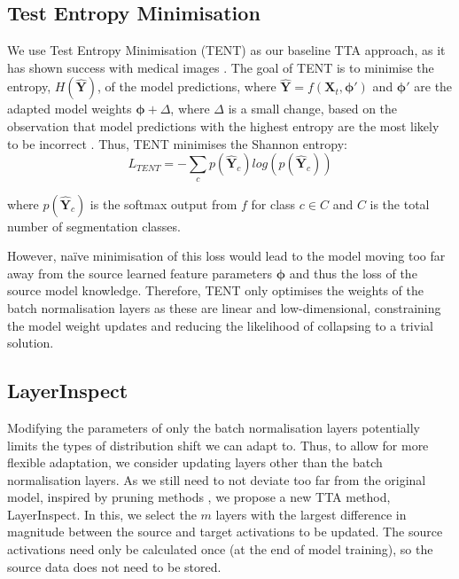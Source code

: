 \documentclass[conference]{IEEEtran}
\begin{document}
\subsection{Test Entropy Minimisation}
We use Test Entropy Minimisation (TENT) \cite{Wang2021} as our baseline TTA approach, as it has shown success with medical images \cite{valanarasu2024fly}. The goal of TENT is to minimise the entropy, $H(\bm{\hat{Y}})$, of the model predictions, where $\bm{\hat{Y}} = f(\bm{X}_t, \bm{\phi}')$ and ${\bm{\phi}'}$ are the adapted model weights ${\bm{\phi}} + \Delta$, where $\Delta$ is a small change, based on the observation that model predictions with the highest entropy are the most likely to be incorrect \cite{Wang2021}. Thus, TENT minimises the Shannon entropy:
\begin{equation}
    L_{TENT} = - \sum_c p(\bm{\hat{Y}}_c)log(p(\bm{\hat{Y}}_c))
\end{equation}
\vspace*{-1pt}

\noindent where $p(\bm{\hat{Y}}_c)$ is the softmax output from $f$ for class $c \in C$ and $C$ is the total number of segmentation classes.

However, na\"ive minimisation of this loss would lead to the model moving too far away from the source learned feature parameters $\bm{\phi}$ and thus the loss of the source model knowledge. Therefore, TENT only optimises the weights of the batch normalisation layers as these are linear and low-dimensional, constraining the model weight updates and reducing the likelihood of collapsing to a trivial solution. 

\subsection{LayerInspect}
Modifying the parameters of only the batch normalisation layers potentially limits the types of distribution shift we can adapt to. Thus, to allow for more flexible adaptation, we consider updating layers other than the batch normalisation layers. As we still need to not deviate too far from the original model, inspired by pruning methods \cite{Dinsdale2022}, we propose a new TTA method, LayerInspect. In this, we select the $m$ layers with the largest difference in magnitude between the source and target activations to be updated. The source activations need only be calculated once (at the end of model training), so the source data does not need to be stored.
\end{document}
